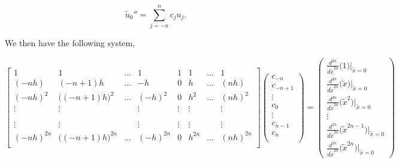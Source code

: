 \documentclass[paper=a4, fontsize=11pt]{scrartcl} %
\numberwithin{equation}{section} %
\numberwithin{figure}{section} %
\numberwithin{table}{section} %
\begin{document}
$$\tilde{u}_0'' = \sum_{j=-n}^{n} c_{j} u_{j}.$$

We then have the following system,

$$\left[ \begin{array}{cccccccc}
1            &                      1                        &        \hdots &   1              &     1         &     1          & \hdots   &    1       \\
(-nh)      &                (-n+1)h                    &        \hdots &  -h             &     0         &     h          & \hdots  &  (nh)   \\
(-nh)^2  &   \bigg((-n+1)h\bigg)^2        &        \hdots &  (-h)^2      &     0         &     h^2     &  \hdots   &  (nh)^2   \\
\vdots   &                   \vdots 	         &         	    &   \vdots     & \vdots     & \vdots     &               &  \vdots   \\
	    &						&   	             &		      &		      &		        &		     &      \\	
	    &						 &   	             &		      &		      &		        &		     &      \\	
\vdots    &                   \vdots 		 &         	    &   \vdots     & \vdots     & \vdots      &               &  \vdots   \\
(-nh)^{2n} &  \bigg((-n+1)h\bigg)^{2n}   &      \hdots &  (-h)^{2n}  &     0         &     h^{2n}  & \hdots   &  (nh)^{2n}   \\
\end{array} \right] %
%
\left( \begin{array}{c}
c_{-n} \\
c_{-n+1} \\
\vdots \\ 
c_{0} \\
\vdots \\
c_{n-1} \\
c_{n} \\
\end{array} \right) =  
%
\left( \begin{array}{c}
\frac{d^{2n}}{d\tilde{x}^{2n}} \big(1\big)\Big|_{\tilde{x}=0} \\
\frac{d^{2n}}{d\tilde{x}^{2n}} \big(\tilde{x} \big)\Big|_{\tilde{x}=0}  \\
\frac{d^{2n}}{d\tilde{x}^{2n}} \big(\tilde{x}^2 \big)\Big|_{\tilde{x}=0} \\
\vdots \\
\frac{d^{2n}}{d\tilde{x}^{2n}} \big(\tilde{x}^{2n-1} \big)\Big|_{\tilde{x}=0}\\
\frac{d^{2n}}{d\tilde{x}^{2n}} \big(\tilde{x}^{2n}    \big)\Big|_{\tilde{x}=0}\end{array} \right)$$ \\
\end{document}
